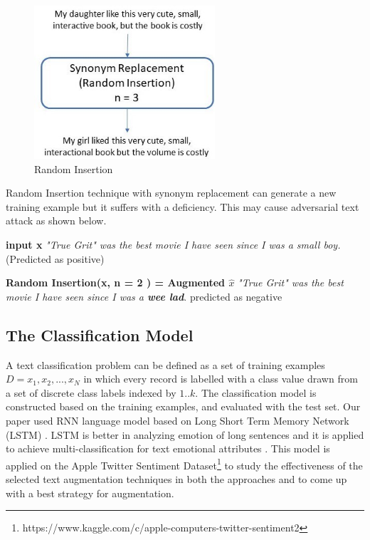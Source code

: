 \documentclass{article}
\begin{document}
\begin{figure}[h!]
\centering
  \includegraphics[width=0.6\textwidth]{random insertion.jpg}
  \caption{Random Insertion}
  \label{fig:randominsert}
\end{figure}

Random Insertion technique with synonym replacement can generate a new training example but it suffers with a deficiency. This may cause adversarial text attack as shown below.

\textbf{input x} \textrightarrow \textit{"True Grit" was the best movie I have seen since I was a small boy.} (Predicted as positive)

\textbf{Random Insertion(x, n = 2 ) = Augmented $\hat{x}$} \textrightarrow \textit{"True Grit" was the best movie I have seen since I was a \textbf{wee lad}}. {predicted as negative}


\subsection{The Classification Model}	

A text classification problem can be defined as a set of training examples $D = { x_1, x_2, . . ., x_N}$ in which every record is labelled with a class value drawn from a set of discrete class labels indexed by ${1..k}$\cite{aggarwal2012survey}. The classification model is constructed based on the training examples, and evaluated with the test set. Our paper used RNN language model based on Long Short Term Memory Network (LSTM) \cite{can2018multilingual}. LSTM is better in analyzing emotion of long sentences and it is applied to achieve multi-classification for text emotional attributes \cite{li2016text}. This model is applied on  the Apple Twitter Sentiment Dataset\footnote{https://www.kaggle.com/c/apple-computers-twitter-sentiment2} to study the effectiveness of the selected text augmentation techniques in both the approaches and to come up with a best strategy for augmentation.
\end{document}
